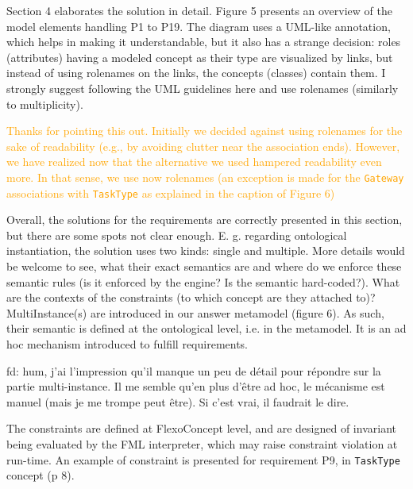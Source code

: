 \documentclass[10pt]{article}
\begin{document}
\begin{response}{Section 4 elaborates the solution in detail. Figure 5 presents an overview of the model elements handling P1 to P19. The diagram uses a UML-like annotation, which helps in making it understandable, but it also has a strange decision: roles (attributes) having a modeled concept as their type are visualized by links, but instead of using rolenames on the links, the concepts (classes) contain them. I strongly suggest following the UML guidelines here and use rolenames (similarly to multiplicity).}

\textcolor{orange}{Thanks for pointing this out. Initially we decided against using rolenames for the sake of readability (e.g., by avoiding clutter near the association ends). However, we have realized now that the alternative we used hampered readability even more. In that sense, we use now rolenames (an exception is made for the \texttt{Gateway} associations with \texttt{TaskType} as explained in the caption of Figure 6)}

\end{response}


\begin{response}{Overall, the solutions for the requirements are correctly presented in this section, but there are some spots not clear enough. E. g. regarding ontological instantiation, the solution uses two kinds: single and multiple. More details would be welcome to see, what their exact semantics are and where do we enforce these semantic rules (is it enforced by the engine? Is the semantic hard-coded?). What are the contexts of the constraints (to which concept are they attached to)?}
MultiInstance(s) are introduced in our answer metamodel (figure 6). As such, their semantic is defined at the ontological level, i.e. in the metamodel. It is an ad hoc mechanism introduced to fulfill requirements.

{\color{red}fd: hum, j'ai l'impression qu'il manque un peu de détail pour répondre sur la partie multi-instance. Il me semble qu'en plus d'être ad hoc, le mécanisme est manuel (mais je me trompe peut être). Si c'est vrai, il faudrait le dire.}


The constraints are defined at FlexoConcept level, and are designed of invariant being evaluated by the FML interpreter, which may raise constraint violation at run-time. An example of constraint is presented for requirement P9, in \texttt{TaskType} concept (p 8).

\end{response}
\end{document}
